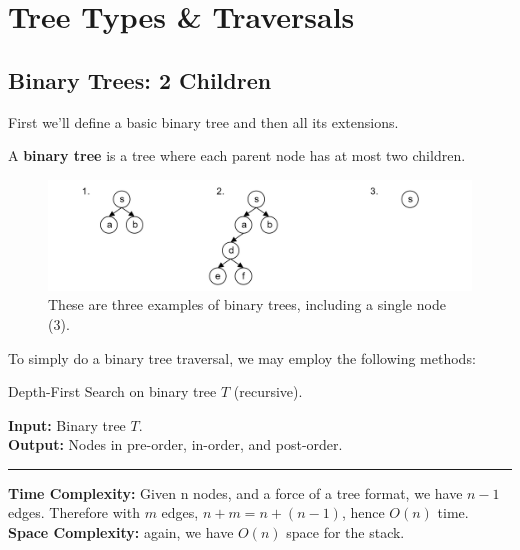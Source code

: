 \section{Tree Types \& Traversals}

\subsection{Binary Trees: 2 Children}

\noindent
First we'll define a basic binary tree and then all its extensions.
\begin{Def}

    A \textbf{binary tree} is a tree where each parent node has at most two children.
\end{Def}

\begin{figure}[h]
    \begin{center}
    \includegraphics[width=\textwidth]{./Sections/graphs/binary_tree.png}
    \end{center}
     \caption{These are three examples of binary trees, including a single node (3).}\label{fig:binary_tree}
  \end{figure}

\noindent
To simply do a binary tree traversal, we may employ the following methods:
\begin{Func}
    Depth-First Search on binary tree $T$ (recursive).
    
    \vspace{.5em}
    \noindent
    \textbf{Input:} Binary tree $T$.\\
    \textbf{Output:} Nodes in pre-order, in-order, and post-order.
    
    \begin{algorithm}[H]
        \SetAlgoLined
    \end{algorithm}
    \noindent
    \rule{\textwidth}{0.4pt}
    \textbf{Time Complexity:} Given n nodes, and a force of a tree format, we have $n-1$ edges. Therefore with $m$ edges, $n+m = n+(n-1)$, hence $O(n)$ time.\\
    \textbf{Space Complexity:} again, we have $O(n)$ space for the stack.
\end{Func}


